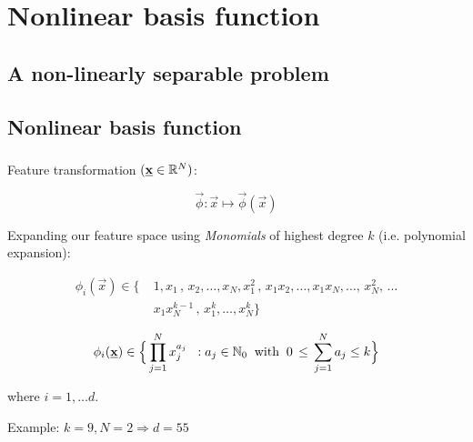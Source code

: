 \section{Nonlinear basis function}

\subsection{A non-linearly separable problem}

\begin{frame}\frametitle{\subsecname}


\end{frame}

\begin{frame}\frametitle{\subsecname}


\end{frame}

\subsection{Nonlinear basis function}


\begin{frame}\frametitle{\subsecname}

Feature transformation $(\underline{\mathbf{x}}\in \mathbb{R}^N)$:

\begin{equation}
\vec \phi: \vec x \mapsto \vec \phi(\vec x)
\end{equation}

Expanding our feature space using \emph{Monomials} of highest degree $k$ (i.e. polynomial expansion):

\begin{align*}
\phi_i(\vec x) \in 
\{\;
&1, 
x_1\,,\, x_2, \ldots, x_N,
x_1^2\,,\, x_1 x_2, \ldots, x_1x_N,\ldots,\,x_N^2,\,\ldots\\
&x_1 x_N^{k-1}\,,\, x_1^k, \ldots, x_N^k
\}
\end{align*}

\begin{equation}
\phi_i(\underline{\mathbf{x}}) \in \Big\{ \prod_{j=1}^N x_j^{a_j} \;\;: a_j \in \mathbb{N}_0 \;\; \text{with} \;\; 0 \, \le \, \sum_{j=1}^{N} a_j \le k  
\Big\} 
\end{equation}

where $i=1,\ldots d$.

Example: $k=9, N=2 \Rightarrow d=55$


\end{frame}

